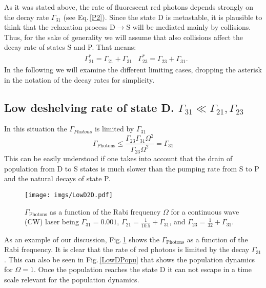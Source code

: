 As it was stated above, the rate of fluorescent red photons depends strongly on the decay rate $\Gamma_{31}$ (see Eq.\,\ref{P2}). Since the state D is metastable, it is plausible to think that the relaxation process D$\rightarrow$S will be mediated mainly by collisions. Thus, for the sake of generality we will assume that also collisions affect the decay rate of states S and P. That means:
\begin{align}
\label{Mod_relax}
& \Gamma_{21}^*=\Gamma_{21}+\Gamma_{31}
& \Gamma_{23}^*=\Gamma_{23}+\Gamma_{31}.
\end{align}
In the following we will examine the different limiting cases, dropping the asterisk in the notation of the decay rates for simplicity.

\subsection{Low deshelving rate of state D. $\Gamma_{31}\ll\Gamma_{21}, \Gamma_{23}$}

In this situation the $\Gamma_{Photons}$ is limited by $\Gamma_{31}$
\begin{equation}
\Gamma_{\text{Photons}}\leq\frac{\Gamma_{23}\Gamma_{31}\Omega^2}{\Gamma_{23}\Omega^2}=\Gamma_{31}
\end{equation}
This can be easily understood if one takes into account that the drain of population from D to S states is much slower than the pumping rate from S to P and the natural decays of state P.

\begin{figure}[ht!]
\begin{center}
\texttt{[image: imgs/LowD2D.pdf]}
\caption{\label{LowD2D} $\Gamma_{\text{Photons}}$ as a function of the Rabi frequency $\Omega$ for a continuous wave (CW) laser being $\Gamma_{31}=0.001$\ns, $\Gamma_{21}=\frac{1}{10.5}+\Gamma_{31}$\ns, and $\Gamma_{23}=\frac{1}{32}+\Gamma_{31}$\ns. }
\end{center}
\end{figure}

As an example of our discussion, Fig.\,\ref{LowD2D} shows the $\Gamma_{\text{Photons}}$ as a function of the Rabi frequency. It is clear that the rate of red photons is limited by the decay $\Gamma_{31}$.  This can also be seen in Fig.\,\ref{LowDPopu} that shows the population dynamics for $\Omega=1$\ns. Once the population reaches the state D it can not escape in a time scale relevant for the population dynamics. 

